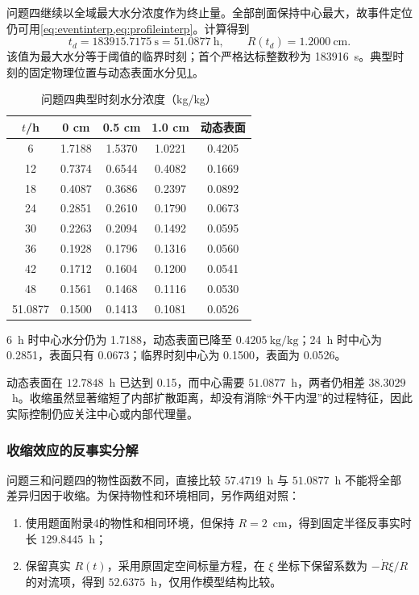 问题四继续以全域最大水分浓度作为终止量。全部剖面保持中心最大，故事件定位仍可用\cref{eq:eventinterp,eq:profileinterp}。计算得到
\begin{equation}
t_d=183915.7175~\mathrm{s}=51.0877~\mathrm{h},\qquad
R(t_d)=1.2000~\mathrm{cm}.
\label{eq:q4time}
\end{equation}
该值为最大水分等于阈值的临界时刻；首个严格达标整数秒为 183916~s。典型时刻的固定物理位置与动态表面水分见\cref{tab:q4}。

\begin{table}[H]
\centering
\caption{问题四典型时刻水分浓度（kg/kg）}\label{tab:q4}
\begin{tabular}{ccccc}
\toprule
$t$/h&0 cm&0.5 cm&1.0 cm&动态表面\\
\midrule
6&1.7188&1.5370&1.0221&0.4205\\
12&0.7374&0.6544&0.4082&0.1669\\
18&0.4087&0.3686&0.2397&0.0892\\
24&0.2851&0.2610&0.1790&0.0673\\
30&0.2263&0.2094&0.1492&0.0595\\
36&0.1928&0.1796&0.1316&0.0560\\
42&0.1712&0.1604&0.1200&0.0541\\
48&0.1561&0.1468&0.1116&0.0530\\
51.0877&0.1500&0.1413&0.1081&0.0526\\
\bottomrule
\end{tabular}
\end{table}

6~h 时中心水分仍为 1.7188，动态表面已降至 $0.4205~\mathrm{kg/kg}$；24~h 时中心为 0.2851，表面只有 0.0673；临界时刻中心为 0.1500，表面为 0.0526。

动态表面在 $12.7848$~h 已达到 0.15，而中心需要 $51.0877$~h，两者仍相差 $38.3029$~h。收缩虽然显著缩短了内部扩散距离，却没有消除“外干内湿”的过程特征，因此实际控制仍应关注中心或内部代理量。

\subsubsection{收缩效应的反事实分解}

问题三和问题四的物性函数不同，直接比较 $57.4719$~h 与 $51.0877$~h 不能将全部差异归因于收缩。为保持物性和环境相同，另作两组对照：
\begin{enumerate}
  \item 使用题面附录4的物性和相同环境，但保持 $R=2$~cm，得到固定半径反事实时长 $129.8445$~h；
  \item 保留真实 $R(t)$，采用原固定空间标量方程，在 $\xi$ 坐标下保留系数为 $-\dot R\xi/R$ 的对流项，得到 $52.6375$~h，仅用作模型结构比较。
\end{enumerate}

